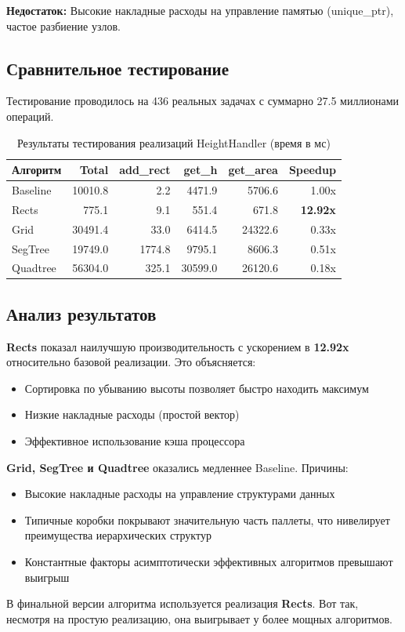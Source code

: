 \textbf{Недостаток:} Высокие накладные расходы на управление памятью (unique\_ptr), частое разбиение узлов.

\subsection{Сравнительное тестирование}

Тестирование проводилось на 436 реальных задачах с суммарно 27.5 миллионами операций.

\begin{table}[ht]
\centering
\caption{Результаты тестирования реализаций HeightHandler (время в мс)}
\label{tab:heighthandler}
\begin{tabular}{|l|r|r|r|r|r|}
\hline
\textbf{Алгоритм} & \textbf{Total} & \textbf{add\_rect} & \textbf{get\_h} & \textbf{get\_area} & \textbf{Speedup} \\
\hline
Baseline & 10010.8 & 2.2 & 4471.9 & 5706.6 & 1.00x \\
Rects & 775.1 & 9.1 & 551.4 & 671.8 & \textbf{12.92x} \\
Grid & 30491.4 & 33.0 & 6414.5 & 24322.6 & 0.33x \\
SegTree & 19749.0 & 1774.8 & 9795.1 & 8606.3 & 0.51x \\
Quadtree & 56304.0 & 325.1 & 30599.0 & 26120.6 & 0.18x \\
\hline
\end{tabular}
\end{table}

\subsection{Анализ результатов}

\textbf{Rects} показал наилучшую производительность с ускорением в \textbf{12.92x} относительно базовой реализации. Это объясняется:
\begin{itemize}
    \item Сортировка по убыванию высоты позволяет быстро находить максимум
    \item Низкие накладные расходы (простой вектор)
    \item Эффективное использование кэша процессора
\end{itemize}

\textbf{Grid, SegTree и Quadtree} оказались медленнее Baseline. Причины:
\begin{itemize}
    \item Высокие накладные расходы на управление структурами данных
    \item Типичные коробки покрывают значительную часть паллеты, что нивелирует преимущества иерархических структур
    \item Константные факторы асимптотически эффективных алгоритмов превышают выигрыш
\end{itemize}

В финальной версии алгоритма используется реализация \textbf{Rects}. Вот так, несмотря на простую реализацию, она выигрывает у более мощных алгоритмов.
